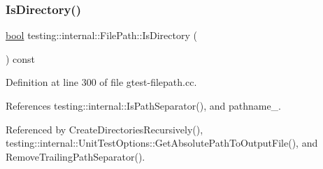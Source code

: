 \mbox{\label{classtesting_1_1internal_1_1FilePath_a73fc042ad65e85bbecb956eb4603a6f2}} 
\subsubsection{\texorpdfstring{Is\+Directory()}{IsDirectory()}}
{\footnotesize\ttfamily \hyperlink{classbool}{bool} testing\+::internal\+::\+File\+Path\+::\+Is\+Directory (\begin{DoxyParamCaption}{ }\end{DoxyParamCaption}) const}



Definition at line 300 of file gtest-\/filepath.\+cc.



References testing\+::internal\+::\+Is\+Path\+Separator(), and pathname\+\_\+.



Referenced by Create\+Directories\+Recursively(), testing\+::internal\+::\+Unit\+Test\+Options\+::\+Get\+Absolute\+Path\+To\+Output\+File(), and Remove\+Trailing\+Path\+Separator().


